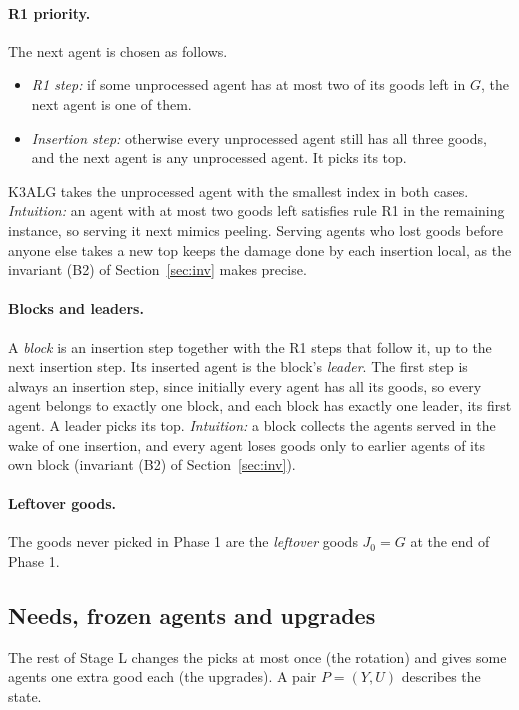 \documentclass[runningheads,11pt]{llncs}
\begin{document}
\paragraph{R1 priority.} The next agent is chosen as follows.
\begin{itemize}
\item \emph{R1 step:} if some unprocessed agent has at most two of its goods left in $G$, the next agent is one of them.
\item \emph{Insertion step:} otherwise every unprocessed agent still has all three goods, and the next agent is any unprocessed agent. It picks its top.
\end{itemize}
K3ALG takes the unprocessed agent with the smallest index in both cases. \emph{Intuition:} an agent with at most two goods left satisfies rule R1 in the remaining instance, so serving it next mimics peeling. Serving agents who lost goods before anyone else takes a new top keeps the damage done by each insertion local, as the invariant (B2) of Section~\ref{sec:inv} makes precise.

\paragraph{Blocks and leaders.} A \emph{block} is an insertion step together with the R1 steps that follow it, up to the next insertion step. Its inserted agent is the block's \emph{leader}. The first step is always an insertion step, since initially every agent has all its goods, so every agent belongs to exactly one block, and each block has exactly one leader, its first agent. A leader picks its top. \emph{Intuition:} a block collects the agents served in the wake of one insertion, and every agent loses goods only to earlier agents of its own block (invariant (B2) of Section~\ref{sec:inv}).

\paragraph{Leftover goods.} The goods never picked in Phase 1 are the \emph{leftover} goods $J_0=G$ at the end of Phase 1.

\subsection{Needs, frozen agents and upgrades}\label{sec:needs}

The rest of Stage L changes the picks at most once (the rotation) and gives some agents one extra good each (the upgrades). A pair $P=(Y,U)$ describes the state.
\end{document}
